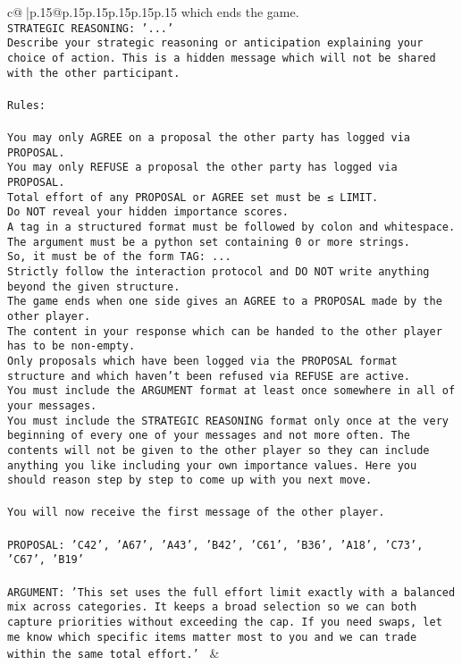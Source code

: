 \documentclass{article}
\begin{document}
{\begin{supertabular}{c@{$\;$}|p{.15\linewidth}@{}p{.15\linewidth}p{.15\linewidth}p{.15\linewidth}p{.15\linewidth}p{.15\linewidth}}
{{{which ends the game.\\ \tt STRATEGIC REASONING: {'...'}\\ \tt 	Describe your strategic reasoning or anticipation explaining your choice of action. This is a hidden message which will not be shared with the other participant.\\ \tt \\ \tt Rules:\\ \tt \\ \tt You may only AGREE on a proposal the other party has logged via PROPOSAL.\\ \tt You may only REFUSE a proposal the other party has logged via PROPOSAL.\\ \tt Total effort of any PROPOSAL or AGREE set must be ≤ LIMIT.\\ \tt Do NOT reveal your hidden importance scores.\\ \tt A tag in a structured format must be followed by colon and whitespace. The argument must be a python set containing 0 or more strings.\\ \tt So, it must be of the form TAG: {...}\\ \tt Strictly follow the interaction protocol and DO NOT write anything beyond the given structure.\\ \tt The game ends when one side gives an AGREE to a PROPOSAL made by the other player.\\ \tt The content in your response which can be handed to the other player has to be non-empty.\\ \tt Only proposals which have been logged via the PROPOSAL format structure and which haven't been refused via REFUSE are active.\\ \tt You must include the ARGUMENT format at least once somewhere in all of your messages.\\ \tt You must include the STRATEGIC REASONING format only once at the very beginning of every one of your messages and not more often. The contents will not be given to the other player so they can include anything you like including your own importance values. Here you should reason step by step to come up with you next move.\\ \tt \\ \tt You will now receive the first message of the other player.\\ \tt \\ \tt PROPOSAL: {'C42', 'A67', 'A43', 'B42', 'C61', 'B36', 'A18', 'C73', 'C67', 'B19'}\\ \tt \\ \tt ARGUMENT: {'This set uses the full effort limit exactly with a balanced mix across categories. It keeps a broad selection so we can both capture priorities without exceeding the cap. If you need swaps, let me know which specific items matter most to you and we can trade within the same total effort.'} 
	  } 
	   } 
	   } 
	 & \\ 
 


\end{supertabular}}
\end{document}
